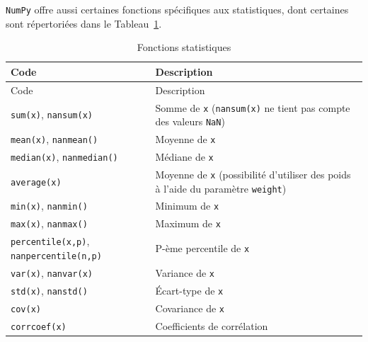 \documentclass[
  12pt,
]{book}
\numberwithin{equation}{section}
\numberwithin{countremarque}{section}
\begin{document}
\texttt{NumPy} offre aussi certaines fonctions spécifiques aux statistiques, dont certaines sont répertoriées dans le Tableau~\ref{tab:numpy-stats-fonctions}.

\begin{longtable}[]{@{}
  >{\raggedleft\arraybackslash}p{}
  >{\raggedleft\arraybackslash}p{}@{}}
\caption{\label{tab:numpy-stats-fonctions} Fonctions statistiques}\tabularnewline
\toprule\noalign{}
\begin{minipage}[b]{\linewidth}\raggedleft
Code
\end{minipage} & \begin{minipage}[b]{\linewidth}\raggedleft
Description
\end{minipage} \\
\midrule\noalign{}
\endfirsthead
\toprule\noalign{}
\begin{minipage}[b]{\linewidth}\raggedleft
Code
\end{minipage} & \begin{minipage}[b]{\linewidth}\raggedleft
Description
\end{minipage} \\
\midrule\noalign{}
\endhead
\bottomrule\noalign{}
\endlastfoot
\texttt{sum(x)}, \texttt{nansum(x)} & Somme de \texttt{x} (\texttt{nansum(x)} ne tient pas compte des valeurs \texttt{NaN}) \\
\texttt{mean(x)}, \texttt{nanmean()} & Moyenne de \texttt{x} \\
\texttt{median(x)}, \texttt{nanmedian()} & Médiane de \texttt{x} \\
\texttt{average(x)} & Moyenne de \texttt{x} (possibilité d'utiliser des poids à l'aide du paramètre \texttt{weight}) \\
\texttt{min(x)}, \texttt{nanmin()} & Minimum de \texttt{x} \\
\texttt{max(x)}, \texttt{nanmax()} & Maximum de \texttt{x} \\
\texttt{percentile(x,p)}, \texttt{nanpercentile(n,p)} & P-ème percentile de \texttt{x} \\
\texttt{var(x)}, \texttt{nanvar(x)} & Variance de \texttt{x} \\
\texttt{std(x)}, \texttt{nanstd()} & Écart-type de \texttt{x} \\
\texttt{cov(x)} & Covariance de \texttt{x} \\
\texttt{corrcoef(x)} & Coefficients de corrélation \\
\end{longtable}
\end{document}
